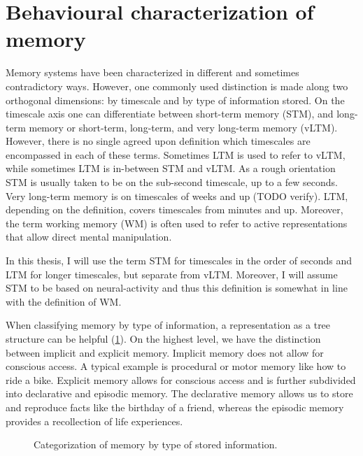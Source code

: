 \section{Behavioural characterization of memory}
Memory systems have been characterized in different and sometimes contradictory ways.
However, one commonly used distinction is made along two orthogonal dimensions:
by timescale and by type of information stored.
On the timescale axis one can differentiate between short-term memory (STM), and long-term memory or short-term, long-term, and very long-term memory (vLTM).
However, there is no single agreed upon definition which timescales are encompassed in each of these terms.
Sometimes LTM is used to refer to vLTM, while sometimes LTM is in-between STM and vLTM\@.
As a rough orientation STM is usually taken to be on the sub-second timescale, up to a few seconds.
Very long-term memory is on timescales of weeks and up (TODO verify).
LTM, depending on the definition, covers timescales from minutes and up.
Moreover, the term working memory (WM) is often used to refer to active representations that allow direct mental manipulation.

In this thesis, I will use the term STM for timescales in the order of seconds and LTM for longer timescales, but separate from vLTM\@.
Moreover, I will assume STM to be based on neural-activity and thus this definition is somewhat in line with the definition of WM\@.

When classifying memory by type of information, a representation as a tree structure can be helpful (\cref{fig:memtypes}).
On the highest level, we have the distinction between implicit and explicit memory.
Implicit memory does not allow for conscious access.
A typical example is procedural or motor memory like how to ride a bike.
Explicit memory allows for conscious access and is further subdivided into declarative and episodic memory.
The declarative memory allows us to store and reproduce facts like the birthday of a friend, whereas the episodic memory provides a recollection of life experiences.
\begin{figure}
    \centering
    \caption{Categorization of memory by type of stored 
        information.}\label{fig:memtypes}
\end{figure}

